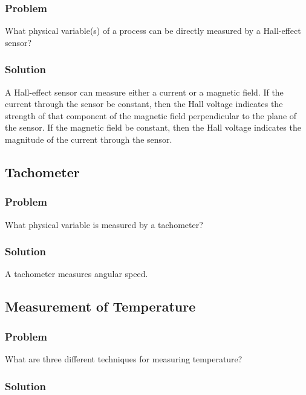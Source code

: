 \subsubsection{Problem}

What physical variable(s) of a process can be directly measured by a
Hall-effect sensor?

\subsubsection{Solution}

A Hall-effect sensor can measure either a current or a magnetic field. If the
current through the sensor be constant, then the Hall voltage indicates the
strength of that component of the magnetic field perpendicular to the plane of
the sensor. If the magnetic field be constant, then the Hall voltage indicates
the magnitude of the current through the sensor.

\subsection{Tachometer}

\subsubsection{Problem}

What physical variable is measured by a tachometer?

\subsubsection{Solution}

A tachometer measures angular speed.

\subsection{Measurement of Temperature}

\subsubsection{Problem}

What are three different techniques for measuring temperature?

\subsubsection{Solution}

